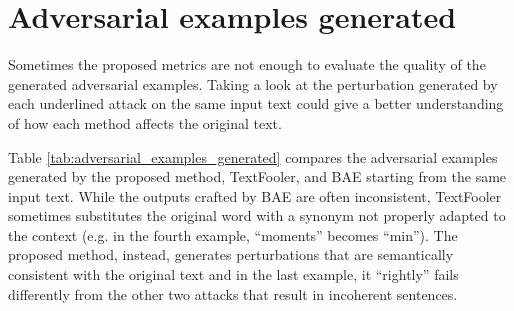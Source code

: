 \section{Adversarial examples generated}\label{sec:adversarial-examples-generated}

Sometimes the proposed metrics are not enough to evaluate the quality of the generated adversarial examples. 
Taking a look at the perturbation generated by each underlined attack on the same input text could give a better understanding of how each method affects the original text.

Table \ref{tab:adversarial_examples_generated} compares the adversarial examples generated by the proposed method, TextFooler, and BAE starting from the same input text.
While the outputs crafted by BAE are often inconsistent, TextFooler sometimes substitutes the original word with a synonym not properly adapted to the context (e.g. in the fourth example, “moments” becomes “min”).
The proposed method, instead, generates perturbations that are semantically consistent with the original text and in the last example, it “rightly” fails differently from the other two attacks that result in incoherent sentences.

